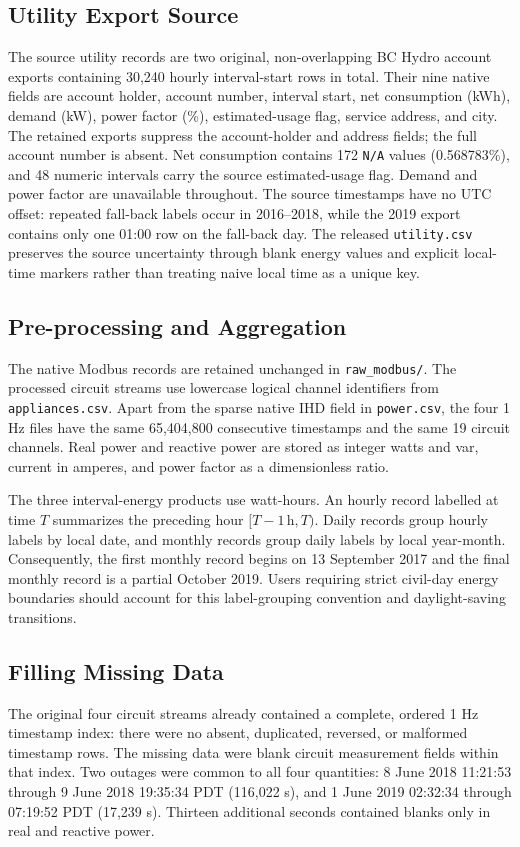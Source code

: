 \documentclass{IEEEoj-data}
\begin{document}
\subsection{Utility Export Source}
The source utility records are two original, non-overlapping BC Hydro account exports containing 30,240 hourly interval-start rows in total. Their nine native fields are account holder, account number, interval start, net consumption (kWh), demand (kW), power factor (\%), estimated-usage flag, service address, and city. The retained exports suppress the account-holder and address fields; the full account number is absent. Net consumption contains 172 \texttt{N/A} values (0.568783\%), and 48 numeric intervals carry the source estimated-usage flag. Demand and power factor are unavailable throughout. The source timestamps have no UTC offset: repeated fall-back labels occur in 2016--2018, while the 2019 export contains only one 01:00 row on the fall-back day. The released \texttt{utility.csv} preserves the source uncertainty through blank energy values and explicit local-time markers rather than treating naive local time as a unique key.

\subsection{Pre-processing and Aggregation}
The native Modbus records are retained unchanged in \texttt{raw\_modbus/}. The processed circuit streams use lowercase logical channel identifiers from \texttt{appliances.csv}. Apart from the sparse native IHD field in \texttt{power.csv}, the four 1 Hz files have the same 65,404,800 consecutive timestamps and the same 19 circuit channels. Real power and reactive power are stored as integer watts and var, current in amperes, and power factor as a dimensionless ratio.

The three interval-energy products use watt-hours. An hourly record labelled at time $T$ summarizes the preceding hour $[T-1\,\mathrm{h},T)$. Daily records group hourly labels by local date, and monthly records group daily labels by local year-month. Consequently, the first monthly record begins on 13 September 2017 and the final monthly record is a partial October 2019. Users requiring strict civil-day energy boundaries should account for this label-grouping convention and daylight-saving transitions.

\subsection{Filling Missing Data}
The original four circuit streams already contained a complete, ordered 1 Hz timestamp index: there were no absent, duplicated, reversed, or malformed timestamp rows. The missing data were blank circuit measurement fields within that index. Two outages were common to all four quantities: 8 June 2018 11:21:53 through 9 June 2018 19:35:34 PDT (116,022 s), and 1 June 2019 02:32:34 through 07:19:52 PDT (17,239 s). Thirteen additional seconds contained blanks only in real and reactive power.
\end{document}
